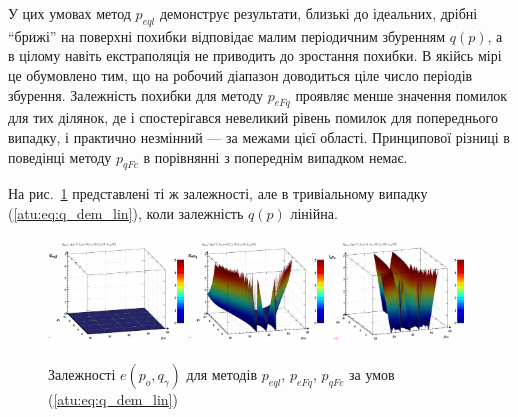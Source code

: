 У цих умовах метод
$ p_{eql} $ демонструє результати, близькі до ідеальних, дрібні
``брижі'' на поверхні похибки відповідає малим періодичним
збуренням
$q(p)$, а в цілому навіть екстраполяція не приводить до зростання
похибки. В якійсь мірі це обумовлено тим, що на робочий діапазон
доводиться ціле число періодів збурення. Залежність похибки
для методу
$ p_{eFq} $ проявляє менше значення помилок для тих ділянок, де
і спостерігався невеликий рівень помилок для попереднього
випадку, і практично незмінний --- за межами цієї
області. Принципової різниці в поведінці методу
$ p_{qFc} $ в порівнянні з попереднім випадком немає.

На рис.~\ref{atu:f:qsl_pe_po_qg_lin} представлені ті ж залежності, але в
тривіальному випадку (\ref{atu:eq:q_dem_lin}), коли залежність
$q(p) $ лінійна.

\begin{figure}[htb!]
  \begin{center}
    \includegraphics[width=0.32\textwidth]{p/qls_pe-p_po_qg_eql_lin.png}
    \hfill
    \includegraphics[width=0.32\textwidth]{p/qls_pe-p_po_qg_eFq_lin.png}
    \hfill
    \includegraphics[width=0.32\textwidth]{p/qls_pe-p_po_qg_eFc_lin.png}
  \end{center}
  \caption{Залежності $e(p_o,q_\gamma)$ для методів $p_{eql}$, $p_{eFq}$, $p_{qFc}$ за умов (\ref{atu:eq:q_dem_lin})}
  \label{atu:f:qsl_pe_po_qg_lin}
\end{figure}


